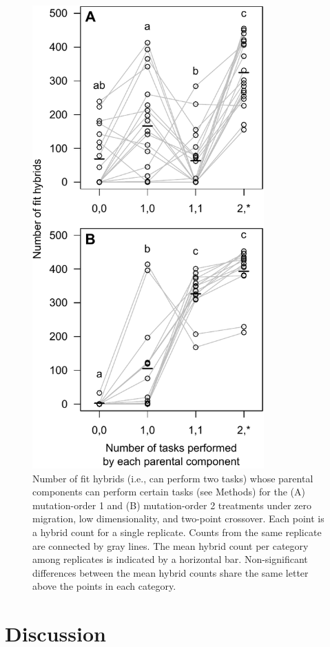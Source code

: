 \begin{doublespace}
\begin{figure}
\centering
\includegraphics[width=3.5in]{fit_hybrid_components.pdf}
\caption{Number of fit hybrids (i.e., can perform two tasks)
  whose parental components can perform certain tasks (see Methods)
  for the (A) mutation-order 1 and (B) mutation-order 2 treatments
  under zero migration, low dimensionality, and two-point crossover.
  Each point is a hybrid count for a single replicate.
  Counts from the same replicate are connected by gray lines.
  The mean hybrid count per category among replicates
  is indicated by a horizontal bar.
  Non-significant differences between the mean hybrid counts
  share the same letter above the points in each category.}
\label{fit_hybrid_components}
\end{figure}



\section{Discussion}


\end{doublespace}

